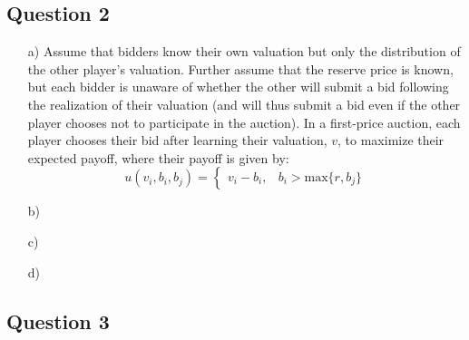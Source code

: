 \documentclass{article}
\begin{document}

\subsection*{Question 2}

\begin{itemize}
	\item[a)] Assume that bidders know their own valuation but only the distribution of the other player's valuation. Further assume that the reserve price is known, but each bidder is unaware of whether the other will submit a bid following the realization of their valuation (and will thus submit a bid even if the other player chooses not to participate in the auction). In a first-price auction, each player chooses their bid after learning their valuation, $v$, to maximize their expected payoff, where their payoff is given by:
		\[
			u(v_i,b_i,b_j) = 	\begin{cases}
									v_i-b_i, &b_i > \text{max}\{r,b_j\}
								\end{cases}
		\]

	
	\item[b)] 


	\item[c)] 


	\item[d)] 


\end{itemize}


\subsection*{Question 3}
\end{document}
